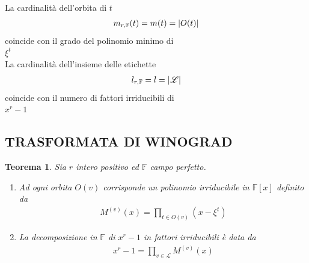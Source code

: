 \documentclass[mathserif]{beamer}
\newtheorem{teorema}{Teorema}
\begin{document}
\begin{frame}
   \begin{center}
      La cardinalità dell'orbita di $t$
        \begin{align*}
	  m_{r,\mathbb{F}}(t) = m(t) = \arrowvert O(t) \arrowvert
	\end{align*}
      coincide con il grado del polinomio minimo di \\
     $\xi^{t}$
     \vspace{0.5cm}
     \\
      La cardinalità dell'insieme delle etichette
 	\begin{align*}
	   l_{r,\mathbb{F}} = l = \arrowvert \mathscr{L} \arrowvert
	\end{align*}
     coincide con il numero di fattori irriducibili di \\
     $x^r-1$
    \end{center}
\end{frame}

\subsection{TRASFORMATA DI WINOGRAD}
\begin{frame}
    \begin{teorema}
      Sia $r$ intero positivo ed $\mathbb{F}$ campo perfetto.
      \begin{enumerate}
	  \item Ad ogni orbita $O(v)$ corrisponde un polinomio irriducibile in $\mathbb{F}[x]$ definito da
		\begin{align*}
		  M^{(v)}(x) =  \prod_{t \in O(v)} (x- \xi^t)
		\end{align*}
	  \item La decomposizione in $\mathbb{F}$ di $x^r - 1$ in fattori irriducibili è data da
		\begin{align*}
		  x^r - 1 = \prod_{v \in \mathscr{L} } M^{(v)}(x)
		\end{align*}
      \end{enumerate}
    \end{teorema}
\end{frame}
\end{document}
